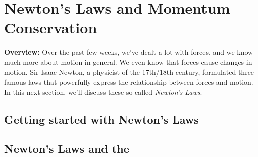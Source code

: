 \section{Newton's Laws and Momentum Conservation}
\label{act8.1.1}

\begin{overview}

	\textbf{Overview:} Over the past few weeks, we've dealt a lot with forces, and we know much more about motion in general. We even know that forces cause changes in motion. Sir Isaac Newton, a physicist of the 17th/18th century, formulated three famous laws that powerfully express the relationship between forces and motion. In this next section, we'll discuss these so-called \emph{Newton's Laws}.

\end{overview}

\subsection{Getting started with Newton's Laws}

\begin{fnt}
	
\end{fnt}

\WCD

\newpage

\subsection{Newton's Laws and the \pConsModel{}}

